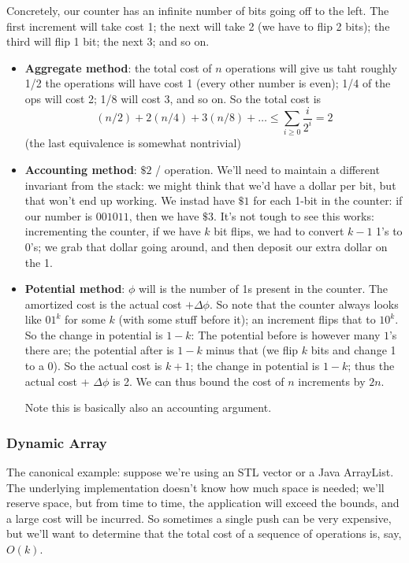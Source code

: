 \documentclass{article}
\begin{document}
Concretely, our counter has an infinite number of bits going
off to the left.
The first increment will take cost 1; the next will take 2 (we have to
flip 2 bits); the third will flip 1 bit; the next 3; and so on.


\begin{itemize}

	\item
	\textbf{Aggregate method}: the total cost of $n$ operations will
	give us taht roughly 1/2 the operations will have cost 1 (every other
	number is even); 1/4 of the ops will cost 2; 1/8 will cost 3, and
	so on.
	So the total cost is
	$$
	(n/2) + 2(n/4) + 3(n/8) + \ldots
	\leq
	\sum_{i\geq 0} \frac{i}{2^i}
	 = 2
	$$
	(the last equivalence is somewhat nontrivial)
	
	\item
	\textbf{Accounting method}: $\$2$ / operation.
	We'll need to maintain a different invariant from the stack: we might
	think that we'd have a dollar per bit, but that won't end up
	working.
	We instad have $\$1$ for each 1-bit in the counter: if our number is
	$001011$, then we have $\$3$.
	It's not tough to see this works: incrementing the counter, if we have
	$k$ bit flips, we had to convert $k-1$ 1's to 0's; we grab that dollar
	going around, and then deposit our extra dollar on the 1.
	
	\item
	\textbf{Potential method}:
	$\phi$ will is the number of 1s present in the counter.
	The amortized cost is the actual cost $+ \Delta\phi$.
	So note that the counter always looks like $01^k$ for some $k$ (with
	some stuff before it);
	an increment flips that to $10^k$.
	So the change in potential is $1 - k$: The potential before is however
	many $1$'s there are; the potential after is $1 - k$ minus that (we
	flip $k$ bits and change 1 to a 0).
	So the actual cost is $k+1$; the change in potential is $1-k$;
	thus the actual cost + $\Delta\phi$ is 2.
	We can thus bound the cost of $n$ increments by $2n$.
	
	Note this is basically also an accounting argument.

\end{itemize}



\subsubsection{Dynamic Array}

The canonical example: suppose we're using an STL vector or a Java
ArrayList.
The underlying implementation doesn't know how much space is needed;
we'll reserve space, but from time to time, the application will
exceed the bounds, and a large cost will be incurred.
So sometimes a single push can be very expensive, but we'll want to 
determine that the total cost of a sequence of operations is, say, $O(k)$.
\end{document}
